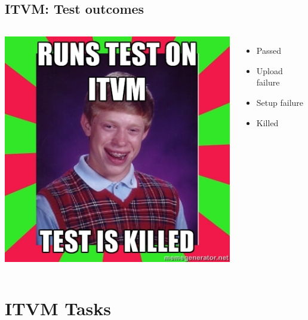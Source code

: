 \documentclass[xcolor=pdftex,dvipsnames,table]{beamer}
\begin{document}
\subsection{ITVM: Test outcomes}
\begin{frame}
  \begin{columns}[cc]
  \column{1.5in}
  \includegraphics[scale=0.33]{brian.jpg}
  \column{1.5in}
  \begin{itemize}
    \item Passed
    \item Upload failure
    \item Setup failure
    \item Killed
  \end{itemize}
  \end{columns}
\end{frame}

\section{ITVM Tasks}
\end{document}

